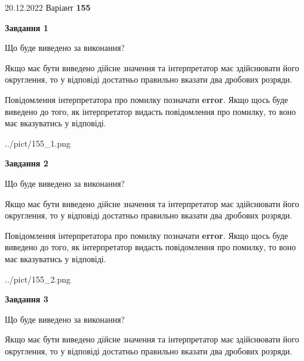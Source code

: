\documentclass[12pt, ukrainian]{article}
\begin{document}
{20.12.2022 Варіант \No \textbf { 155 }\par}
{
\begin {Large}

{\begin {center}\textbf{Завдання 1}\end {center}}\par
Що буде виведено за виконання? \par

Якщо має бути виведено дійсне значення та інтерпретатор має здійснювати його округлення, 
то у відповіді достатньо правильно вказати два дробових розряди.

Повідомлення інтерпретатора про помилку позначати \textbf{error}.
Якщо щось буде виведено до того, як інтерпретатор видасть повідомлення про помилку, 
то воно має вказуватись у відповіді. \par

\begin{center}
	{../pict/155_1.png}
\end{center}
\newpage

{\begin {center}\textbf{Завдання 2}\end {center}}\par
Що буде виведено за виконання? \par

Якщо має бути виведено дійсне значення та інтерпретатор має здійснювати його округлення, 
то у відповіді достатньо правильно вказати два дробових розряди.

Повідомлення інтерпретатора про помилку позначати \textbf{error}.
Якщо щось буде виведено до того, як інтерпретатор видасть повідомлення про помилку, 
то воно має вказуватись у відповіді. \par

\begin{center}
	{../pict/155_2.png}
\end{center}
\newpage

{\begin {center}\textbf{Завдання 3}\end {center}}\par
Що буде виведено за виконання? \par

Якщо має бути виведено дійсне значення та інтерпретатор має здійснювати його округлення, 
то у відповіді достатньо правильно вказати два дробових розряди.


\end{Large}}
\end{document}
